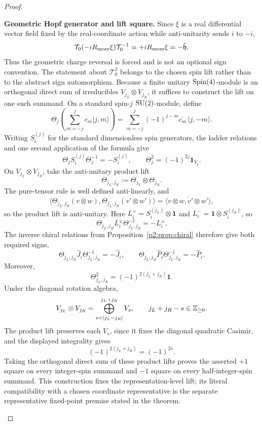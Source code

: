 \documentclass[12pt,a4paper]{article}
\begin{document}
\begin{proof}
\begin{proofsteps}
\item \textbf{Geometric Hopf generator and lift square.}
Since \(\xi\) is a real differential vector field fixed by the real-coordinate
action while anti-unitarity sends \(i\) to \(-i\),
\[
\mathcal T_0(-iR_{\mathrm{mom}}\xi)\mathcal T_0^{-1}
=+iR_{\mathrm{mom}}\xi
=-\hat{\mathfrak h}.
\]
Thus the geometric charge reversal is forced and is not an optional sign
convention.  The statement about \(\mathcal T_0^2\) belongs to the chosen
spin lift rather than to the abstract sign automorphism.  Because a finite
unitary \(\mathrm{Spin}(4)\)-module is an orthogonal direct sum of irreducibles
\(V_{j_L}\otimes V_{j_R}\), it suffices to construct the lift on one such
summand.  On a standard spin-\(j\) \(\mathrm{SU}(2)\)-module, define
\[
\Theta_j\!\left(\sum_{m=-j}^{j}c_m|j,m\rangle\right)
=
\sum_{m=-j}^{j}(-1)^{j-m}\overline{c_m}\,|j,-m\rangle .
\]
Writing \(S_i^{(j)}\) for the standard dimensionless spin generators, the
ladder relations and one second application of the formula give
\[
 \Theta_j S_i^{(j)}\Theta_j^{-1}=-S_i^{(j)},
 \qquad
 \Theta_j^2=(-1)^{2j}\mathbf 1_{V_j}.
\]
On \(V_{j_L}\otimes V_{j_R}\), take the anti-unitary product lift
\[
 \Theta_{j_L,j_R}:=\Theta_{j_L}\otimes\Theta_{j_R}.
\]
The pure-tensor rule is well defined anti-linearly, and
\[
 \big\langle\Theta_{j_L,j_R}(v\otimes w),
 \Theta_{j_L,j_R}(v'\otimes w')\big\rangle
 =
 \overline{\big\langle v\otimes w,v'\otimes w'\big\rangle},
\]
so the product lift is anti-unitary.
Here
\(L_i^+=S_i^{(j_L)}\otimes\mathbf 1\) and
\(L_i^-=\mathbf 1\otimes S_i^{(j_R)}\), so
\[
 \Theta_{j_L,j_R}L_i^\pm\Theta_{j_L,j_R}^{-1}=-L_i^\pm.
\]
The inverse chiral relations from
Proposition~\ref{p2:prop:chiral} therefore give both required signs,
\[
 \Theta_{j_L,j_R}\hat J_i\Theta_{j_L,j_R}^{-1}=-\hat J_i,
 \qquad
 \Theta_{j_L,j_R}\hat P_i\Theta_{j_L,j_R}^{-1}=-\hat P_i.
\]
Moreover,
\[
 \Theta_{j_L,j_R}^2
 =(-1)^{2(j_L+j_R)}\mathbf 1.
\]
Under the diagonal rotation algebra,
\[
 V_{j_L}\otimes V_{j_R}
 =\bigoplus_{s=|j_L-j_R|}^{j_L+j_R}V_s,
 \qquad j_L+j_R-s\in\mathbb{Z}_{\ge0}.
\]
The product lift preserves each \(V_s\), since it fixes the diagonal
quadratic Casimir, and the displayed integrality gives
\[
 (-1)^{2(j_L+j_R)}=(-1)^{2s}.
\]
Taking the orthogonal direct sum of these product lifts proves the asserted
\(+1\) square on every integer-spin summand and \(-1\) square on every
half-integer-spin summand.  This construction fixes the representation-level
lift; its literal compatibility with a chosen coordinate representative is
the separate representative fixed-point premise stated in the theorem.
\end{proofsteps}
\end{proof}
\end{document}
